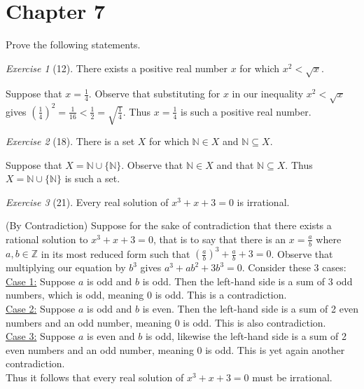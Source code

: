 \documentclass[12pt]{amsart}
\makeatletter
\theoremstyle{remark}
\newtheorem*{exercise}{Exercise}%
\def\NN{\ensuremath{\mathbb N}}
\def\ZZ{\ensuremath{\mathbb Z}}
\renewenvironment{proof}[1][\proofname]{\par\doublespacing
  \pushQED{\qed}%
  \normalfont \topsep6\p@\@plus6\p@\relax
  \list{}{%
    \settowidth{\leftmargin}{\itshape\proofname:\hskip\labelsep}%
    \setlength{\labelwidth}{0pt}%
    \setlength{\itemindent}{-\leftmargin}%
  }%
  \item[\hskip\labelsep\itshape#1\@addpunct{:}]\ignorespaces
}{%
  \popQED\endlist\@endpefalse
  \singlespacing
}
\theoremstyle{mycomment}
\makeatother
\begin{document}
\thispagestyle{fancy}

\section*{Chapter 7} Prove the following statements.
\begin{exercise}[12] There exists a positive real number $x$ for which $x^{2}<\sqrt{x}$.
\begin{proof}
  Suppose that $x = \frac{1}{4}$. Observe that substituting for $x$ in our inequality $x^2 < \sqrt{x}$ gives $(\frac{1}{4})^2 = \frac{1}{16} < \frac{1}{2} = \sqrt{\frac{1}{4}}$. Thus $x = \frac{1}{4}$ is such a positive real number.
\end{proof}
\end{exercise}

\begin{exercise}[18] There is a set $X$ for which $\NN\in X$ and $\NN\subseteq X$.
\begin{proof}
  Suppose that $X = \NN \cup \{\NN\}$. Observe that $\NN \in X$ and that $\NN \subseteq X$. Thus $X = \NN \cup \{\NN\}$ is such a set.
\end{proof}
\end{exercise}

\begin{exercise}[21] Every real solution of $x^{3}+x+3=0$ is irrational.
\begin{proof}
  (By Contradiction) Suppose for the sake of contradiction that there exists a rational solution to $x^{3} + x +3 = 0$, that is to say that there is an $x = \frac{a}{b}$ where $a,b \in \ZZ$ in its most reduced form such that $(\frac{a}{b})^3 + \frac{a}{b} + 3 = 0$. Observe that multiplying our equation by $b^3$ gives $a^3 + ab^2 + 3b^3 = 0$. Consider these 3 cases:\\ 
  \underline{Case 1:} Suppose $a$ is odd and $b$ is odd. Then the left-hand side is a sum of 3 odd numbers, which is odd, meaning 0 is odd. This is a contradiction. \\
  \underline{Case 2:} Suppose $a$ is odd and $b$ is even. Then the left-hand side is a sum of 2 even numbers and an odd number, meaning 0 is odd. This is also contradiction. \\
  \underline{Case 3:} Suppose $a$ is even and $b$ is odd, likewise the left-hand side is a sum of 2 even numbers and an odd number, meaning 0 is odd. This is yet again another contradiction. \\
  Thus it follows that every real solution of $x^3 + x + 3 = 0$ must be irrational.
\end{proof}
\end{exercise}
\end{document}
